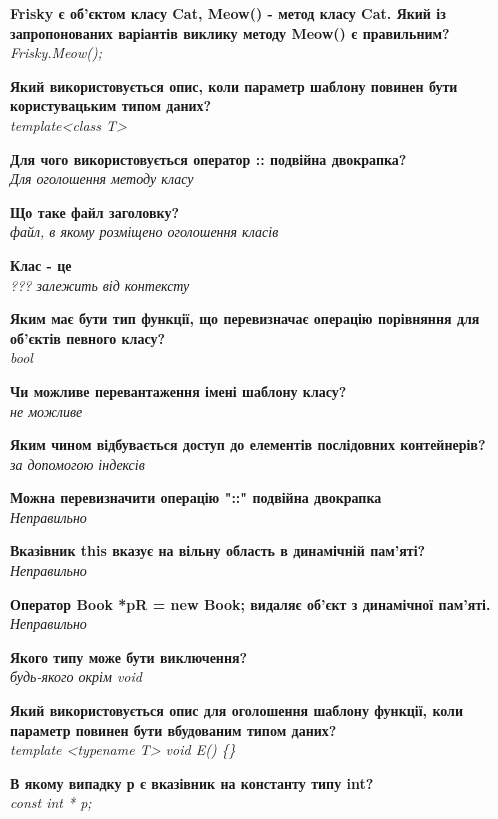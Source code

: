 \documentclass{article}
\begin{document}
\begin{list}{}{}
	\item \textbf{Frisky є об'єктом класу Cat, Meow() - метод класу Cat. Який із запропонованих варіантів виклику методу Meow() є правильним?} \\ \textit{Frisky.Meow();}
	\item \textbf{Який використовується опис, коли параметр шаблону повинен бути користувацьким типом даних?} \\ \textit{template<class T>}
	\item \textbf{Для чого використовується оператор :: подвійна двокрапка?} \\ \textit{Для оголошення методу класу}
	\item \textbf{Що таке файл заголовку?} \\ \textit{файл, в якому розміщено оголошення класів}
	\item \textbf{Клас - це} \\ \textit{??? залежить від контексту}
	\item \textbf{Яким має бути тип функції, що перевизначає операцію порівняння для об'єктів певного класу?} \\ \textit{bool}
	\item \textbf{Чи можливе перевантаження імені шаблону класу?} \\ \textit{не можливе}
	\item \textbf{Яким чином відбувається доступ до елементів послідовних контейнерів?} \\ \textit{за допомогою індексів}
	\item \textbf{Можна перевизначити операцію "::" подвійна двокрапка} \\ \textit{Неправильно}
	\item \textbf{Вказівник this вказує на вільну область в динамічній пам'яті?} \\ \textit{Неправильно}
	\item \textbf{Оператор Book *pR = new Book; видаляє об'єкт з динамічної пам'яті.} \\ \textit{Неправильно}
	\item \textbf{Якого типу може бути виключення?} \\ \textit{будь-якого окрім void}
	\item \textbf{Який використовується опис для оголошення шаблону функції, коли параметр
		повинен бути вбудованим типом даних?} \\ \textit{template <typename T> void E() \{\}}
	\item \textbf{В якому випадку р є вказівник на константу типу int?} \\ \textit{const int * p;}

\end{list}
\end{document}
